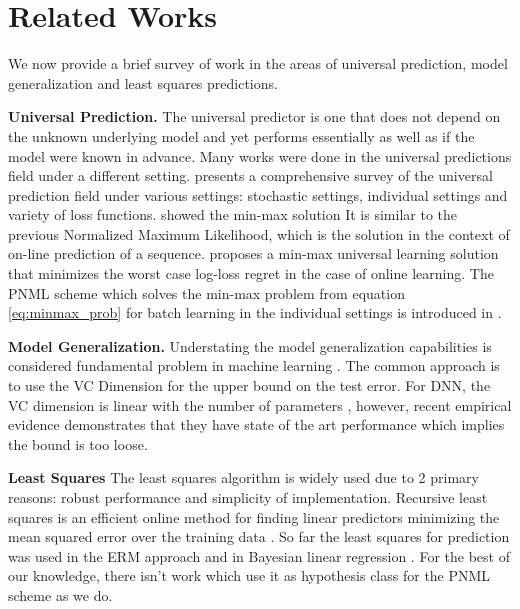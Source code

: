 \documentclass[conference,letterpaper]{IEEEtran}
\begin{document}
\section{Related Works} \label{sec:related_works}
We now provide a brief survey of work in the areas of universal prediction, model generalization and least squares predictions.

\textbf{Universal Prediction.}
The universal predictor is one that does not depend on the unknown underlying model and yet performs essentially as well as if the model were known in advance.
Many works were done in the universal predictions field under a different setting.
\cite{feder1992universal} presents a comprehensive survey of the universal prediction field under various settings: stochastic settings, individual settings and variety of loss functions. 
\cite{shtar1987universal} showed the min-max solution It is similar to the previous Normalized Maximum Likelihood, which is the solution in the context of on-line prediction of a sequence.  
\cite{Fogel2017} proposes a min-max universal learning solution that minimizes the worst case log-loss regret in the case of online learning.
The PNML scheme which solves the min-max problem from equation \ref{eq:minmax_prob} for batch learning in the individual settings is introduced in \cite{Fogel2018}.

\textbf{Model Generalization.} 
Understating the model generalization capabilities is considered fundamental problem in machine learning  \cite{vapnik2013nature}. 
The common approach is to use the VC Dimension for the upper bound on the test error.
For DNN, the VC dimension is linear with the number of parameters \cite{sontag1998vc}, however, recent empirical evidence demonstrates that they have state of the art performance which implies the bound is too loose.

\textbf{Least Squares}
The least squares algorithm is widely used due to 2 primary reasons: robust performance and simplicity of implementation.
Recursive least squares is an efficient online method for finding linear predictors minimizing the mean squared error over the training data \cite{hayes19969}.
So far the least squares for prediction was used in the ERM approach and in Bayesian linear regression \cite{fornalski2015applications}. For the best of our knowledge, there isn't work which use it as hypothesis class for the PNML scheme as we do.
\end{document}
